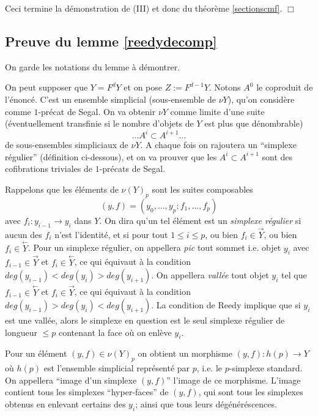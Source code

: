 \documentclass[12pt]{article}
\newcommand{\subnumero}[1]{\subsection*{#1}\phantomsection\addcontentsline{toc}{subsection}{#1}}
\newcommand{\eop}{\hfill $\Box$\vspace{.1in}}
\newcommand{\direct}[1]{\stackrel{\rightarrow}{#1}}
\newcommand{\inverse}[1]{\stackrel{\leftarrow}{#1}}
\begin{document}
Ceci termine la d\'emonstration de (III) et donc du th\'eor\`eme
\ref{sectionscmf}.
\eop

\subnumero{Preuve du lemme \ref{reedydecomp}}

On garde les notations du lemme \`a d\'emontrer.

On peut supposer que $Y=F^dY$ et on pose $Z:= F^{d-1}Y$. Notons
$A^0$ le coproduit de l'\'enonc\'e. C'est un ensemble simplicial
(sous-ensemble de $\nu Y$), qu'on consid\`ere comme $1$-pr\'ecat de Segal. On va
obtenir $\nu Y$ comme limite d'une suite (\'eventuellement transfinie si le
nombre
d'objets de $Y$ est plus que d\'enombrable)
$$
\ldots A^i\subset A^{i+1}\ldots
$$
de sous-ensembles simpliciaux de $\nu Y$. A chaque fois on rajoutera un
``simplexe r\'egulier'' (d\'efinition ci-dessous), et on va prouver que les
$A^i\subset A^{i+1}$ sont des cofibrations triviales de $1$-pr\'ecats de Segal.

Rappelons que les \'el\'ements de $\nu (Y)_p$ sont les suites
composables
$$
(y,f) =(y_0,\ldots , y_p; f_1,\ldots , f_p)
$$
avec $f_i:
y_{i-1}\rightarrow y_i$ dans $Y$. On dira qu'un tel \'el\'ement est un {\em
simplexe r\'egulier} si aucun des $f_i$ n'est l'identit\'e, et si pour tout
$1\leq i \leq p$, ou bien $f_i \in \direct{Y}$, ou bien $f_i \in \inverse{Y}$.
Pour un simplexe r\'egulier, on appellera {\em pic} tout sommet i.e. objet $y_i$
avec $f_{i-1}\in \direct{Y}$ et $f_i\in \inverse{Y}$, ce qui \'equivaut
\`a la condition $deg(y_{i-1}) < deg(y_i) > deg(y_{i+1})$. On appellera {\em
vall\'ee} tout objet $y_i$ tel que $f_{i-1}\in \inverse{Y}$ et $f_i\in
\direct{Y}$, ce qui \'equivaut \`a la condition $deg(y_{i-1}) > deg(y_i) <
deg(y_{i+1})$. La condition de Reedy implique que si $y_i$ est une vall\'ee,
alors le simplexe en question est le seul simplexe r\'egulier de longueur $\leq
p$ contenant la face o\`u on enl\`eve $y_i$.

Pour un \'el\'ement $(y,f)\in \nu (Y)_p$ on obtient un morphisme
$(y,f):h(p)\rightarrow Y$ o\`u $h(p)$ est l'ensemble simplicial repr\'esent\'e
par $p$, i.e. le $p$-simplexe standard.
On appellera ``image d'un simplexe $(y,f)$'' l'image
de ce morphisme.
L'image contient
tous les simplexes ``hyper-faces'' de $(y,f)$, qui sont tous les simplexes
obtenus en enlevant certains des $y_i$; ainsi que tous leurs
d\'eg\'en\'er\'escences.
\end{document}
